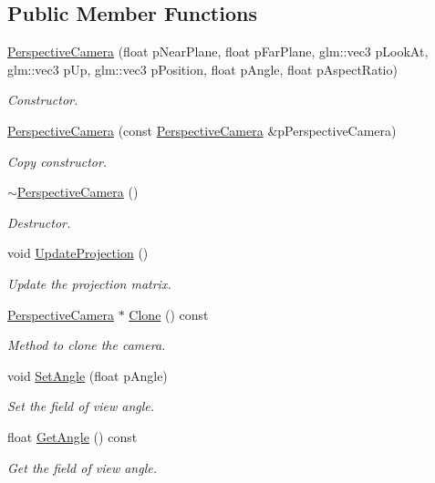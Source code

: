 \subsection*{Public Member Functions}
\begin{DoxyCompactItemize}
\item 
\hyperlink{class_perspective_camera_a701bf1d9090bb34a960d152ed85f1f5c}{Perspective\+Camera} (float p\+Near\+Plane, float p\+Far\+Plane, glm\+::vec3 p\+Look\+At, glm\+::vec3 p\+Up, glm\+::vec3 p\+Position, float p\+Angle, float p\+Aspect\+Ratio)
\begin{DoxyCompactList}\small\item\em Constructor. \end{DoxyCompactList}\item 
\hyperlink{class_perspective_camera_adfe834fa0ca591dd84a4785f594d8ba9}{Perspective\+Camera} (const \hyperlink{class_perspective_camera}{Perspective\+Camera} \&p\+Perspective\+Camera)
\begin{DoxyCompactList}\small\item\em Copy constructor. \end{DoxyCompactList}\item 
\hyperlink{class_perspective_camera_a935a64c478ab072bb9ba050b7d388526}{$\sim$\+Perspective\+Camera} ()
\begin{DoxyCompactList}\small\item\em Destructor. \end{DoxyCompactList}\item 
void \hyperlink{class_perspective_camera_acffce4415501bb3839f8e50a22465169}{Update\+Projection} ()
\begin{DoxyCompactList}\small\item\em Update the projection matrix. \end{DoxyCompactList}\item 
\hyperlink{class_perspective_camera}{Perspective\+Camera} $\ast$ \hyperlink{class_perspective_camera_a551b2bb8f13d7f89b2459436f6b275fb}{Clone} () const 
\begin{DoxyCompactList}\small\item\em Method to clone the camera. \end{DoxyCompactList}\item 
void \hyperlink{class_perspective_camera_a7e581143f69d58edc94ddc224f29971c}{Set\+Angle} (float p\+Angle)
\begin{DoxyCompactList}\small\item\em Set the field of view angle. \end{DoxyCompactList}\item 
float \hyperlink{class_perspective_camera_a7ed08d265308466003b674ab535823ce}{Get\+Angle} () const 
\begin{DoxyCompactList}\small\item\em Get the field of view angle. \end{DoxyCompactList}\end{DoxyCompactItemize}
